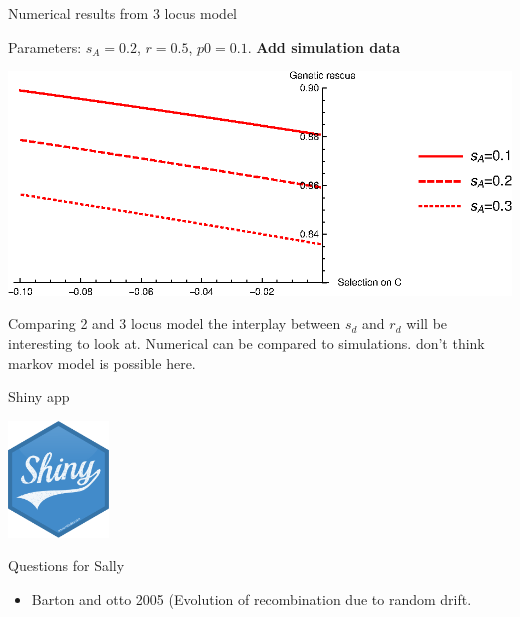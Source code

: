 \documentclass{beamer}
\begin{document}
\begin{frame}{Numerical results from 3 locus model}
 
 Parameters: $s_A = 0.2$, $r=0.5$, $p0 = 0.1$.
 \textbf{Add simulation data}
 
 \vfill
 
 \includegraphics[width = 1.0\textwidth]{Matlab/Figures/3locuseffect.eps}
     
\end{frame}

\begin{frame}{Comparing 2 and 3 locus model}
    the interplay between $s_d$ and $r_d$ will be interesting to look at. Numerical can be compared to simulations. don't think markov model is possible here.
\end{frame}

\begin{frame}{Shiny app}
\begin{center}
    \includegraphics[width=0.2\textwidth]{Figures/shiny-hex.png}
\end{center}
\end{frame}


\begin{frame}{Questions for Sally}
\begin{itemize}
\footnotesize
    \item Barton and otto 2005 (Evolution of recombination due to random drift.
    \normalsize
\end{itemize}
    
\end{frame}


\iffalse
\end{document}
